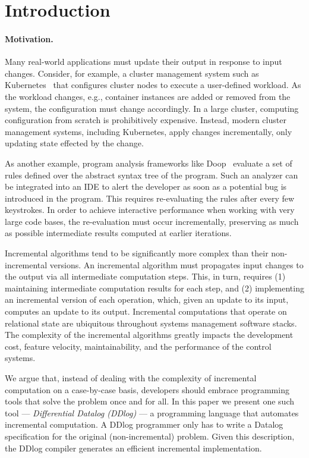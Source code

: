 \section{Introduction}\label{sec-introduction}

\paragraph{Motivation.}
Many real-world applications must update their output in response to input changes.  Consider, for
example, a cluster management system such as Kubernetes~\cite{kubernetes} that configures cluster
nodes to execute a user-defined workload.  As the workload changes, e.g., container instances are
added or removed from the system, the configuration must change accordingly.  In a large cluster,
computing configuration from scratch is prohibitively expensive.  Instead, modern cluster management
systems, including Kubernetes, apply changes incrementally, only updating state effected by the
change.

As another example, program analysis frameworks like Doop~\cite{Bravenboer-oopsla09} evaluate a set
of rules defined over the abstract syntax tree of the program.  Such an analyzer can be integrated
into an IDE to alert the developer as soon as a potential bug is introduced in the program.  This
requires re-evaluating the rules after every few keystrokes.  In order to achieve interactive
performance when working with very large code bases, the re-evaluation must occur incrementally,
preserving as much as possible intermediate results computed at earlier iterations.

Incremental algorithms tend to be significantly more complex than
their non-incremental versions.  An incremental algorithm must
propagates input changes to the output via all intermediate
computation steps.  This, in turn, requires (1) maintaining
intermediate computation results for each step, and (2) implementing
an incremental version of each operation, which, given an update to
its input, computes an update to its output.  Incremental computations
that operate on relational state are ubiquitous throughout systems
management software stacks.  The complexity of the incremental algorithms
greatly impacts the development cost, feature velocity,
maintainability, and the performance of the control systems.

We argue that, instead of dealing with the complexity of incremental
computation on a case-by-case basis, developers should embrace
programming tools that solve the problem once and for all.  In this
paper we present one such tool --- \emph{Differential Datalog (DDlog)}
--- a programming language that automates incremental computation.  A
DDlog programmer only has to write a Datalog specification for the
original (non-incremental) problem.  Given this description, the DDlog
compiler generates an efficient incremental implementation.

